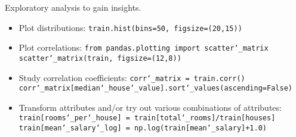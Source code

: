 Exploratory analysis to gain insights.
\begin{itemize}
\vspace{-3.0mm}
\item
Plot distributions:\newline
\texttt{train.hist(bins=50, figsize=(20,15))} 
\item
Plot correlations:\newline
\texttt{from pandas.plotting import scatter\char`_matrix}\newline
\texttt{scatter\char`_matrix(train, figsize=(12,8))}
\item
Study correlation coefficients:\newline
\texttt{corr\char`_matrix = train.corr()}\newline
\texttt{corr\char`_matrix[\textquotesingle median\char`_house\char`_value\textquotesingle].sort\char`_values(ascending=False)}
\item
Transform attributes and/or try out various combinations of attributes:\newline
\texttt{train[\textquotesingle rooms\char`_per\char`_house\textquotesingle] = train[\textquotesingle total\char`_rooms\textquotesingle]/train[\textquotesingle houses\textquotesingle]}\newline
\texttt{train[\textquotesingle mean\char`_salary\char`_log\textquotesingle] = np.log(train[\textquotesingle mean\char`_salary\textquotesingle]+1.0)}\newline
\end{itemize}

